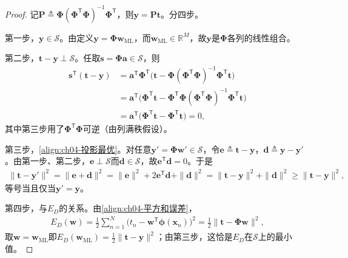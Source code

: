 \documentclass[../../main.tex]{subfiles}
\begin{document}
\begin{proof}
记$\boldsymbol{P}\triangleq\boldsymbol{\Phi}(\boldsymbol{\Phi}^{\mathsf{T}}\boldsymbol{\Phi})^{-1}\boldsymbol{\Phi}^{\mathsf{T}}$，则$\boldsymbol{y}=\boldsymbol{P}\boldsymbol{t}$。分四步。

第一步，$\boldsymbol{y}\in\mathcal{S}$。由定义$\boldsymbol{y}=\boldsymbol{\Phi}\boldsymbol{w}_{\mathrm{ML}}$，而$\boldsymbol{w}_{\mathrm{ML}}\in\mathbb{R}^{M}$，故$\boldsymbol{y}$是$\boldsymbol{\Phi}$各列的线性组合。

第二步，$\boldsymbol{t}-\boldsymbol{y}\perp\mathcal{S}$。任取$\boldsymbol{s}=\boldsymbol{\Phi}\boldsymbol{a}\in\mathcal{S}$，则
\begin{align*}
  \boldsymbol{s}^{\mathsf{T}}(\boldsymbol{t}-\boldsymbol{y})
  &=\boldsymbol{a}^{\mathsf{T}}\boldsymbol{\Phi}^{\mathsf{T}}\bigl(\boldsymbol{t}-\boldsymbol{\Phi}(\boldsymbol{\Phi}^{\mathsf{T}}\boldsymbol{\Phi})^{-1}\boldsymbol{\Phi}^{\mathsf{T}}\boldsymbol{t}\bigr)\\
  &=\boldsymbol{a}^{\mathsf{T}}\bigl(\boldsymbol{\Phi}^{\mathsf{T}}\boldsymbol{t}-\boldsymbol{\Phi}^{\mathsf{T}}\boldsymbol{\Phi}(\boldsymbol{\Phi}^{\mathsf{T}}\boldsymbol{\Phi})^{-1}\boldsymbol{\Phi}^{\mathsf{T}}\boldsymbol{t}\bigr)\\
  &=\boldsymbol{a}^{\mathsf{T}}\bigl(\boldsymbol{\Phi}^{\mathsf{T}}\boldsymbol{t}-\boldsymbol{\Phi}^{\mathsf{T}}\boldsymbol{t}\bigr)=0,
\end{align*}
其中第三步用了$\boldsymbol{\Phi}^{\mathsf{T}}\boldsymbol{\Phi}$可逆（由列满秩假设）。

第三步，\eqref{align:ch04-投影最优}。对任意$\boldsymbol{y}'=\boldsymbol{\Phi}\boldsymbol{w}'\in\mathcal{S}$，令$\boldsymbol{e}\triangleq\boldsymbol{t}-\boldsymbol{y}$，$\boldsymbol{d}\triangleq\boldsymbol{y}-\boldsymbol{y}'$。由第一步、第二步，$\boldsymbol{e}\perp\mathcal{S}$而$\boldsymbol{d}\in\mathcal{S}$，故$\boldsymbol{e}^{\mathsf{T}}\boldsymbol{d}=0$。于是
\begin{align*}
  \|\boldsymbol{t}-\boldsymbol{y}'\|^2=\|\boldsymbol{e}+\boldsymbol{d}\|^2
  =\|\boldsymbol{e}\|^2+2\boldsymbol{e}^{\mathsf{T}}\boldsymbol{d}+\|\boldsymbol{d}\|^2
  =\|\boldsymbol{t}-\boldsymbol{y}\|^2+\|\boldsymbol{d}\|^2\geqslant\|\boldsymbol{t}-\boldsymbol{y}\|^2,
\end{align*}
等号当且仅当$\boldsymbol{y}'=\boldsymbol{y}$。

第四步，与$E_D$的关系。由\eqref{align:ch04-平方和误差}，
\begin{align*}
  E_D(\boldsymbol{w})=\frac{1}{2}\sum_{n=1}^{N}\bigl(t_n-\boldsymbol{w}^{\mathsf{T}}\boldsymbol{\phi}(\boldsymbol{x}_n)\bigr)^2
  =\frac{1}{2}\|\boldsymbol{t}-\boldsymbol{\Phi}\boldsymbol{w}\|^2,
\end{align*}
取$\boldsymbol{w}=\boldsymbol{w}_{\mathrm{ML}}$即$E_D(\boldsymbol{w}_{\mathrm{ML}})=\frac{1}{2}\|\boldsymbol{t}-\boldsymbol{y}\|^2$；由第三步，这恰是$E_D$在$\mathcal{S}$上的最小值。
\end{proof}
\end{document}
